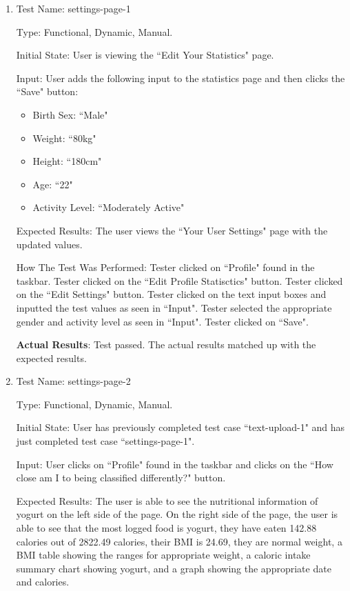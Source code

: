 \documentclass[12pt, titlepage]{article}
\begin{document}
	\begin{enumerate}
		\item{Test Name: settings-page-1}
		
		Type: Functional, Dynamic, Manual.
		
		Initial State: User is viewing the ``Edit Your Statistics" page.
		
		Input: User adds the following input to the statistics page and then clicks the ``Save" button:
		
	\begin{itemize}
		\item Birth Sex: ``Male"
		\item Weight: ``80kg"
		\item Height: ``180cm"
		\item Age: ``22"
		\item Activity Level: ``Moderately Active"
	\end{itemize}
		
		Expected Results: The user views the ``Your User Settings" page with the updated values.
		
		How The Test Was Performed: Tester clicked on ``Profile" found in the taskbar. Tester clicked on the ``Edit Profile Statisctics" button. Tester clicked on the ``Edit Settings" button. Tester clicked on the text input boxes and inputted the test values as seen in ``Input". Tester selected the appropriate gender and activity level as seen in ``Input". Tester clicked on ``Save".
		
		\textbf{Actual Results}: Test passed. The actual results matched up with the expected results.
		
		\item{Test Name: settings-page-2}
		
		Type: Functional, Dynamic, Manual.
		
		Initial State: User has previously completed test case ``text-upload-1" and has just completed test case ``settings-page-1".
		
		Input: User clicks on ``Profile" found in the taskbar and clicks on the ``How close am I to being classified differently?" button.
		
		Expected Results: The user is able to see the nutritional information of yogurt on the left side of the page. On the right side of the page, the user is able to see that the most logged food is yogurt, they have eaten 142.88 calories out of 2822.49 calories, their BMI is 24.69, they are normal weight, a BMI table showing the ranges for appropriate weight, a caloric intake summary chart showing yogurt, and a graph showing the appropriate date and calories.
		

\end{enumerate}
\end{document}
